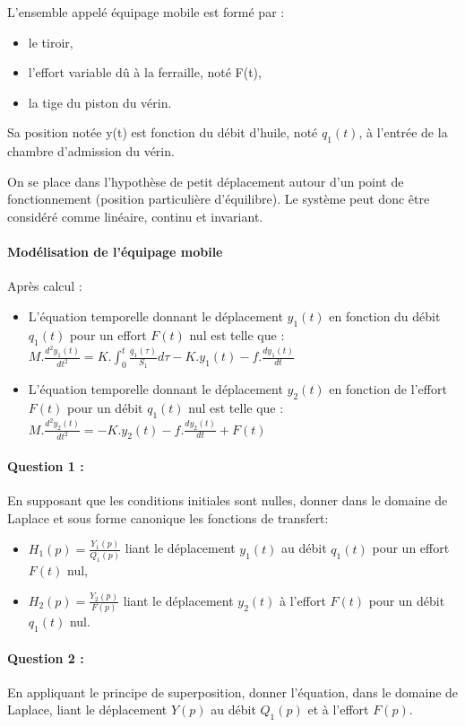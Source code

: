 L'ensemble appelé \og équipage mobile \fg est formé par :
\begin{itemize}
 \item le tiroir,
 \item l'effort variable dû à la ferraille, noté F(t),
 \item la tige du piston du vérin.
\end{itemize}

Sa position notée y(t) est fonction du débit d'huile, noté $q_1(t)$, à l'entrée de la chambre d'admission du vérin.

On se place dans l'hypothèse de petit déplacement autour d'un point de fonctionnement (position particulière d'équilibre). Le système peut donc être considéré comme linéaire, continu et invariant.

\paragraph{Modélisation de l'équipage mobile}

Après calcul :
\begin{itemize}
 \item L'équation temporelle donnant le déplacement $y_1(t)$ en fonction du débit $q_1(t)$ pour un effort $F(t)$ nul est telle que : 
 $M.\frac{d^2y_1(t)}{dt^2}=K.\int_{0}^{t} \frac{q_1(\tau)}{S_1}d\tau-K.y_1(t)-f.\frac{dy_1(t)}{dt}$
 \item L'équation temporelle donnant le déplacement $y_2(t)$ en fonction de l'effort $F(t)$ pour un débit $q_1(t)$ nul est telle que :
 $M.\frac{d^2y_2(t)}{dt^2}=-K.y_2(t)-f.\frac{dy_2(t)}{dt}+F(t)$
\end{itemize}

\paragraph{Question 1 :} En supposant que les conditions initiales sont nulles, donner dans le domaine de Laplace et sous forme canonique les fonctions de transfert:

\begin{itemize}
 \item $H_1(p)=\frac{Y_1(p)}{Q_1(p)}$ liant le déplacement $y_1(t)$ au débit $q_1(t)$ pour un effort $F(t)$ nul,
 \item $H_2(p)=\frac{Y_2(p)}{F(p)}$ liant le déplacement $y_2(t)$ à l'effort $F(t)$ pour un débit $q_1(t)$ nul.
\end{itemize}
  
\paragraph{Question 2 :} En appliquant le principe de superposition, donner l'équation, dans le domaine de Laplace, liant le déplacement $Y(p)$ au débit $Q_1(p)$ et à l'effort $F(p)$.

